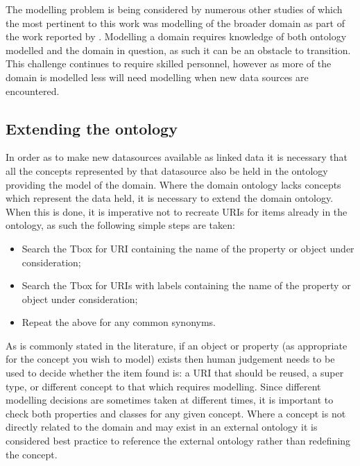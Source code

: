The modelling problem is being considered by numerous other studies of which the most pertinent to this work was modelling of the broader domain as part of the work reported by \citet{Tutcher2015}.  Modelling a domain requires knowledge of both ontology modelled and the domain in question, as such it can be an obstacle to transition. This challenge continues to require skilled personnel, however as more of the domain is modelled less will need modelling when new data sources are encountered. 

\subsection{Extending the ontology}
\label{sec:addingtripples}
In order as to make new datasources available as linked data it is necessary that all the concepts represented by that datasource also be held in the ontology providing the model of the domain. Where the domain ontology lacks concepts which represent the data held, it is necessary to extend the domain ontology. When this is done, it is imperative not to recreate URIs for items already in the ontology, as such the following simple steps are taken:
 \begin{itemize}
	\item Search the Tbox for URI containing the name of the property or object under consideration;
	\item Search the Tbox for URIs with labels containing the name of the property or object under consideration;
	\item Repeat the above for any common synonyms.
\end{itemize}

As is commonly stated in the literature, if an object or property (as appropriate for the concept you wish to model) exists then human judgement needs to be used to decide whether the item found is: a URI that should be reused, a super type, or different concept to that which requires modelling. Since different modelling decisions are sometimes taken at different times, it is important to check both properties and classes for any given concept. Where a concept is not directly related to the domain and may exist in an external ontology it is considered best practice to reference the external ontology rather than redefining the concept.

